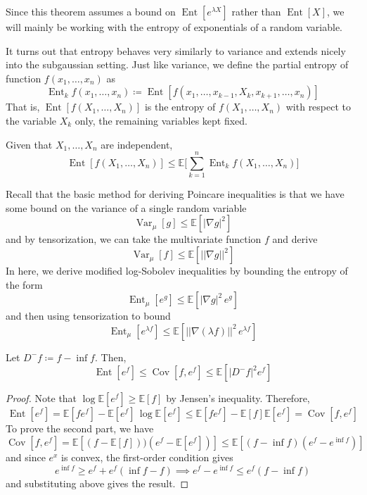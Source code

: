\documentclass{article}
\DeclareMathOperator{\Cov}{Cov}
\DeclareMathOperator{\Var}{Var}
\DeclareMathOperator{\Ent}{Ent}
\begin{document}
Since this theorem assumes a bound on $\Ent[e^{\lambda X}]$ rather than $\Ent[X]$, we will mainly be working with the entropy of exponentials of a random variable. 

It turns out that entropy behaves very similarly to variance and extends nicely into the subgaussian setting. Just like variance, we define the partial entropy of function $f(x_1, \ldots, x_n)$ as 
\[\Ent_k f (x_1, \ldots, x_n) \coloneqq \Ent[ f(x_1, \ldots, x_{k-1}, X_k , x_{k+1}, \ldots, x_n)]\]
That is, $\Ent[f(X_1, \ldots, X_n)]$ is the entropy of $f(X_1, \ldots, X_n)$ with respect to the variable $X_k$ only, the remaining variables kept fixed. 

\begin{theorem}
Given that $X_1, \ldots, X_n$ are independent, 
\[\Ent[ f(X_1, \ldots, X_n)] \leq \mathbb{E} \bigg[ \sum_{k=1}^n \Ent_k f (X_1, \ldots, X_n) \bigg]\]
\end{theorem}

Recall that the basic method for deriving Poincare inequalities is that we have some bound on the variance of a single random variable 
\[\Var_\mu [g] \leq \mathbb{E}[|\nabla g|^2]\]
and by tensorization, we can take the multivariate function $f$ and derive 
\[\Var_\mu [f] \leq \mathbb{E}[ ||\nabla g||^2 ]\]
In here, we derive modified log-Sobolev inequalities by bounding the entropy of the form 
\[\Ent_\mu [e^g] \leq \mathbb{E}[ |\nabla g|^2 \, e^g ]\]
and then using tensorization to bound 
\[\Ent_\mu [e^{\lambda f}] \leq \mathbb{E} [ ||\nabla (\lambda f)||^2 \, e^{\lambda f} ]\]

\begin{lemma}
Let $D^- f \coloneqq f - \inf f$. Then, 
\[\Ent[e^f] \leq \Cov[f, e^f] \leq \mathbb{E}[|D^- f|^2 e^f]\]
\end{lemma}
\begin{proof}
Note that $\log \mathbb{E}[e^f] \geq \mathbb{E}[f]$ by Jensen's inequality. Therefore, 
\[\Ent[e^f] = \mathbb{E}[f e^f] - \mathbb{E}[e^f] \, \log \mathbb{E}[e^f] \leq \mathbb{E}[f e^f] - \mathbb{E}[f] \mathbb{E}[e^f] = \Cov[f, e^f]\]
To prove the second part, we have 
\[\Cov[f, e^f] = \mathbb{E}[(f - \mathbb{E}[f]))(e^f - \mathbb{E}[e^f])] \leq \mathbb{E}[(f - \inf f)(e^f - e^{\inf f})] \]
and since $e^x$ is convex, the first-order condition gives 
\[e^{\inf f} \geq e^f + e^f (\inf f - f) \implies e^f - e^{\inf f} \leq e^f (f - \inf f)\]
and substituting above gives the result. 
\end{proof}
\end{document}
